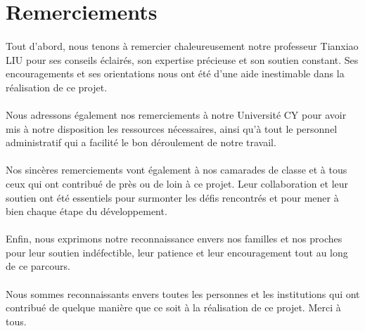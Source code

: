 \documentclass[11pt, french]{article}
\begin{document}


\tableofcontents
\listoffigures
\listoftables


\newpage
\section* {Remerciements}
\paragraph{}
Tout d'abord, nous tenons à remercier chaleureusement notre professeur Tianxiao LIU  pour ses conseils éclairés, son expertise précieuse et son soutien constant. Ses encouragements et ses orientations nous ont été d'une aide inestimable dans la réalisation de ce projet.
\paragraph{}
Nous adressons également nos remerciements à notre Université CY  pour avoir mis à notre disposition les ressources nécessaires, ainsi qu'à tout le personnel administratif qui a facilité le bon déroulement de notre travail.
\paragraph{}
Nos sincères remerciements vont également à nos camarades de classe et à tous ceux qui ont contribué de près ou de loin à ce projet. Leur collaboration et leur soutien ont été essentiels pour surmonter les défis rencontrés et pour mener à bien chaque étape du développement.
\paragraph{}
Enfin, nous exprimons notre reconnaissance envers nos familles et nos proches pour leur soutien indéfectible, leur patience et leur encouragement tout au long de ce parcours.
\paragraph{}
Nous sommes reconnaissants envers toutes les personnes et les institutions qui ont contribué de quelque manière que ce soit à la réalisation de ce projet. Merci à tous.








\newpage

\nocite{*}
\end{document}
